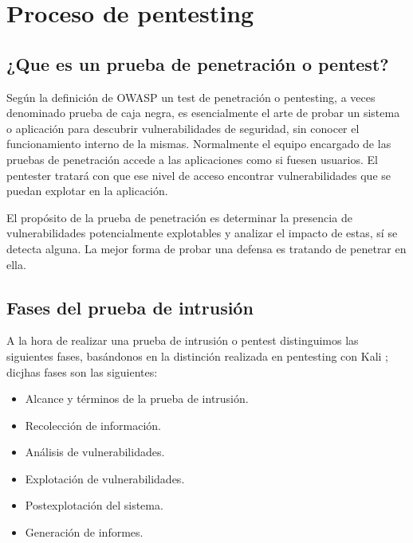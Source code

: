 \section{Proceso de pentesting} 

\subsection{¿Que es un prueba de penetración o pentest?}
Según la definición de OWASP \cite{web1} un test de penetración o pentesting, a veces denominado 
prueba de caja negra, es esencialmente el arte de probar
un sistema o aplicación para descubrir vulnerabilidades de seguridad, sin conocer el funcionamiento interno de la mismas. Normalmente el equipo 
encargado de las pruebas de penetración accede a las aplicaciones como si fuesen usuarios. El pentester tratará con 
que ese nivel de acceso encontrar vulnerabilidades que se puedan explotar en la aplicación.

El propósito de la prueba de penetración es determinar la presencia 
de vulnerabilidades potencialmente explotables y analizar el impacto de estas,
sí se detecta alguna. La mejor forma de probar una defensa es tratando de penetrar en ella.
\clearpage
\newpage

\subsection{Fases del prueba de intrusión}
A la hora de realizar una prueba de intrusión o pentest distinguimos las siguientes fases, basándonos en 
la distinción realizada en pentesting con Kali  \cite{ref1};  dicjhas fases son las siguientes:
\begin{itemize}
    \item Alcance y términos de la prueba de intrusión.
    \item Recolección de información.
    \item Análisis de vulnerabilidades.
    \item Explotación de vulnerabilidades.
    \item Postexplotación del sistema.
    \item Generación de informes.
\end{itemize}
